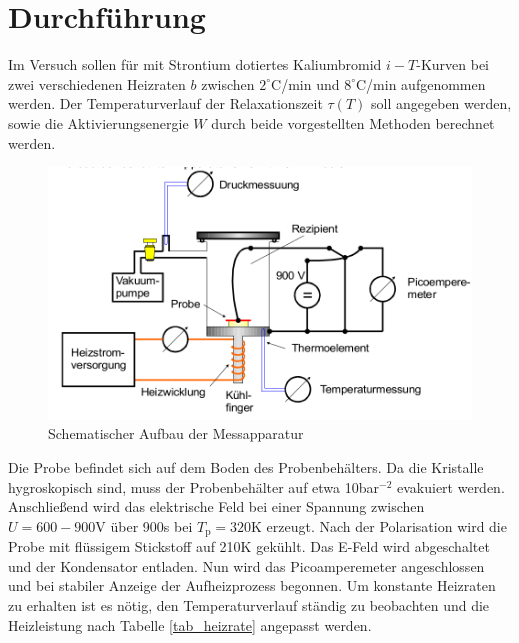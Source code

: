\section{Durchführung}
Im Versuch sollen für mit Strontium dotiertes Kaliumbromid $i-T$-Kurven bei zwei verschiedenen Heizraten $b$ zwischen $2 ^\circ$C/min und $8 ^\circ$C/min
aufgenommen werden. Der Temperaturverlauf der Relaxationszeit $\tau(T)$ soll angegeben werden, sowie die Aktivierungsenergie $W$ durch beide vorgestellten
Methoden berechnet werden.
\begin{figure}[H]
\includegraphics[width=\textwidth]{../pics/dipolAufbau.png}
\caption{Schematischer Aufbau der Messapparatur}
\label{pic_dipolaufbau}
\end{figure}
Die Probe befindet sich auf dem Boden des Probenbehälters. Da die Kristalle hygroskopisch sind, muss der Probenbehälter auf etwa 10bar$^{-2}$
evakuiert werden. Anschließend wird das elektrische Feld bei einer Spannung zwischen $U = 600-900$V über 900s bei $T_\text{p}=320$K erzeugt. Nach der
Polarisation wird die Probe mit flüssigem Stickstoff auf 210K gekühlt. Das E-Feld wird abgeschaltet und der Kondensator entladen. Nun wird das
Picoamperemeter angeschlossen und bei stabiler Anzeige der Aufheizprozess begonnen. Um konstante Heizraten zu erhalten ist es nötig, den Temperaturverlauf
ständig zu beobachten und die Heizleistung nach Tabelle \ref{tab_heizrate} angepasst werden.

